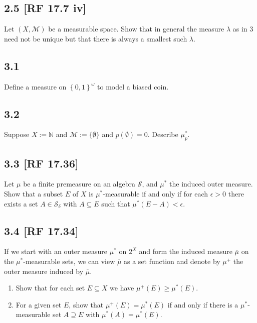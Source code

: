 \documentclass[12pt]{article}
\begin{document}
\subsection*{2.5 [RF 17.7 iv]}
\begin{tcolorbox}
Let $(X,\mathcal{M})$ be a measurable space. Show that in general the measure $\lambda$ as in 3 need not be unique but that there is always a smallest
such $\lambda$.
\end{tcolorbox}


\newpage
\subsection*{3.1}
\begin{tcolorbox}
Define a measure on $\left\{ 0,1 \right\}^{\omega}$ to model a biased coin.
\end{tcolorbox}


\subsection*{3.2}
\begin{tcolorbox}
Suppose $X := \mathbb{N}$ and $\mathcal{M} := \{\emptyset\}$ and $p(\emptyset) = 0$. Describe $\mu_{p}^{*}$.
\end{tcolorbox}


\subsection*{3.3 [RF 17.36]}
\begin{tcolorbox}
Let $\mu$ be a finite premeasure on an algebra $\mathcal{S}$, and $\mu^{*}$ the induced outer measure. Show that a subset $E$ of $X$ is
$\mu^*$-measurable if and only if for each $\epsilon > 0$ there exists a set $A \in \mathcal{S}_{\delta}$ with $A\subseteq E$ such that $\mu^*(E-A) <
\epsilon$.
\end{tcolorbox}


\subsection*{3.4 [RF 17.34]}
\begin{tcolorbox}
If we start with an outer measure $\mu^{*}$ on $2^{X}$ and form the induced measure $\bar{\mu}$ on the $\mu^{*}$-measurable sets, we can view
$\bar{\mu}$ as a set function and denote by $\mu^{+}$ the outer measure induced by $\bar{\mu}$.
\begin{enumerate}[label=(\alph*)]
\item Show that for each set $E \subseteq X$ we have $\mu^{+}(E) \geq \mu^{*}(E)$.
\item For a given set $E$, show that $\mu^{+}(E) = \mu^*(E)$ if and only if there is a $\mu^*$-measurable set $A \supseteq E$ with $\mu^*(A) =
\mu^*(E)$.
\end{enumerate}
\end{tcolorbox}
\end{document}
